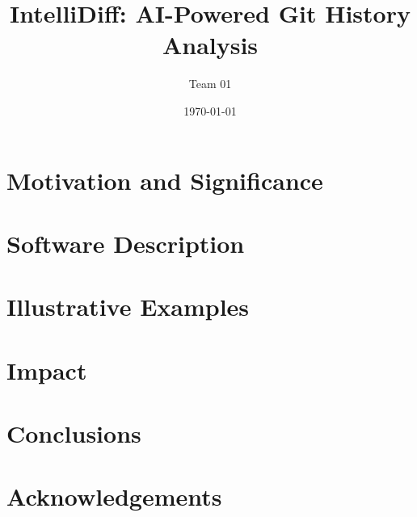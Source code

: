 \documentclass[12pt]{article}
\title{IntelliDiff: AI-Powered Git History Analysis}
\author{Team 01}
\date{\today}
\begin{document}
\maketitle



\section{Motivation and Significance}


\section{Software Description}


\section{Illustrative Examples}


\section{Impact}


\section{Conclusions}


\section*{Acknowledgements}

\end{document}
